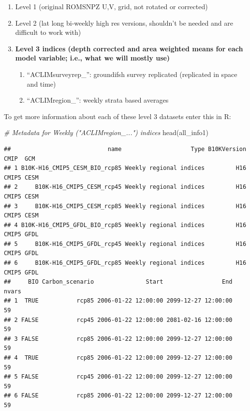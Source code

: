 \documentclass[
]{article}
\newenvironment{Shaded}{\begin{snugshade}}{\end{snugshade}}
\newcommand{\CommentTok}[1]{\textcolor[rgb]{0.56,0.35,0.01}{\textit{#1}}}
\newcommand{\FunctionTok}[1]{\textcolor[rgb]{0.00,0.00,0.00}{#1}}
\newcommand{\NormalTok}[1]{#1}
\providecommand{\tightlist}{%
  \setlength{\itemsep}{0pt}\setlength{\parskip}{0pt}}
\begin{document}
\begin{enumerate}
\def\labelenumi{\arabic{enumi}.}
\tightlist
\item
  Level 1 (original ROMSNPZ U,V, grid, not rotated or corrected)\\
\item
  Level 2 (lat long bi-weekly high res versions, shouldn't be needed and
  are difficult to work with)\\
\item
  \textbf{Level 3 indices (depth corrected and area weighted means for
  each model variable; i.e., what we will mostly use) }

  \begin{enumerate}
  \def\labelenumii{\alph{enumii}.}
  \tightlist
  \item
    ``ACLIMsurveyrep\_'': groundifsh survey replicated (replicated in
    space and time)
  \item
    ``ACLIMregion\_'': weekly strata based averages
  \end{enumerate}
\end{enumerate}

To get more information about each of these level 3 datasets enter this
in R:

\begin{Shaded}
\begin{Highlighting}[]
    \CommentTok{\# Metadata for Weekly ("ACLIMregion\_...") indices}
    \FunctionTok{head}\NormalTok{(all\_info1)}
\end{Highlighting}
\end{Shaded}

\begin{verbatim}
##                            name                    Type B10KVersion  CMIP  GCM
## 1 B10K-H16_CMIP5_CESM_BIO_rcp85 Weekly regional indices         H16 CMIP5 CESM
## 2     B10K-H16_CMIP5_CESM_rcp45 Weekly regional indices         H16 CMIP5 CESM
## 3     B10K-H16_CMIP5_CESM_rcp85 Weekly regional indices         H16 CMIP5 CESM
## 4 B10K-H16_CMIP5_GFDL_BIO_rcp85 Weekly regional indices         H16 CMIP5 GFDL
## 5     B10K-H16_CMIP5_GFDL_rcp45 Weekly regional indices         H16 CMIP5 GFDL
## 6     B10K-H16_CMIP5_GFDL_rcp85 Weekly regional indices         H16 CMIP5 GFDL
##     BIO Carbon_scenario               Start                 End nvars
## 1  TRUE           rcp85 2006-01-22 12:00:00 2099-12-27 12:00:00    59
## 2 FALSE           rcp45 2006-01-22 12:00:00 2081-02-16 12:00:00    59
## 3 FALSE           rcp85 2006-01-22 12:00:00 2099-12-27 12:00:00    59
## 4  TRUE           rcp85 2006-01-22 12:00:00 2099-12-27 12:00:00    59
## 5 FALSE           rcp45 2006-01-22 12:00:00 2099-12-27 12:00:00    59
## 6 FALSE           rcp85 2006-01-22 12:00:00 2099-12-27 12:00:00    59
\end{verbatim}
\end{document}
